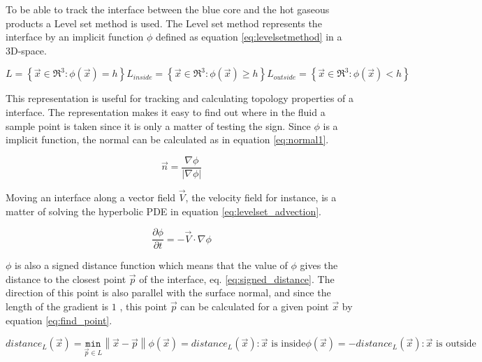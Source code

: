 To be able to track the interface between the blue core and the hot gaseous products a Level set method is used. The Level set method represents the interface by an implicit function $\phi$ defined as equation \ref{eq:levelsetmethod} in a 3D-space. 

\begin{subequations}
\label{eq:levelsetmethod}
\begin{equation}
 L = \left \{ \vec{x} \in \Re^3 : \phi(\vec{x}) = h  \right \}
\end{equation}    
\begin{equation}
  L_{inside} = \left \{ \vec{x} \in \Re^3 : \phi(\vec{x}) \geq h  \right \}
\end{equation}
\begin{equation}
  L_{outside} = \left \{ \vec{x} \in \Re^3 : \phi(\vec{x}) <  h  \right \}
\end{equation}
\end{subequations}

This representation is useful for tracking and calculating topology properties of a interface. The representation makes it easy to find out where in the fluid a sample point is taken since it is only a matter of testing the sign. Since $\phi$ is a implicit function, the normal can be calculated as in equation \ref{eq:normal1}.

\begin{equation}
\label{eq:normal1}
 \vec{n} = \frac{ \nabla \phi }{ \left | \nabla \phi \right | }
\end{equation}    

Moving an interface along a vector field $\vec{V}$, the velocity field for instance, is a matter of solving the hyperbolic PDE in equation \ref{eq:levelset_advection}.

 \begin{equation}
\label{eq:levelset_advection}
  \frac{\partial \phi}{\partial t} = -\vec{V} \cdot \nabla \phi
\end{equation}  

$\phi$ is also a signed distance function which means that the value of $\phi$ gives the distance to the closest point $\vec{p}$ of the interface, eq. \ref{eq:signed_distance}. The direction of this point is also parallel with the surface normal, and since the length of the gradient is $1$ \cite{bridson}, this point $\vec{p}$ can be calculated for a given point $\vec{x}$ by equation \ref{eq:find_point}.

\begin{subequations}
\label{eq:signed_distance}
\begin{equation}
distance_L(\vec{x}) = \underset{\vec{p} \in L}{\texttt{min}} \left \| \vec{x} - \vec{p} \right \|
\end{equation}    
\begin{equation}
\phi(\vec{x}) = distance_L(\vec{x}) : \vec{x} \text{ is inside}
\end{equation}
\begin{equation}
\phi(\vec{x}) = -distance_L(\vec{x}) : \vec{x} \text{ is outside}
\end{equation}
\end{subequations}

